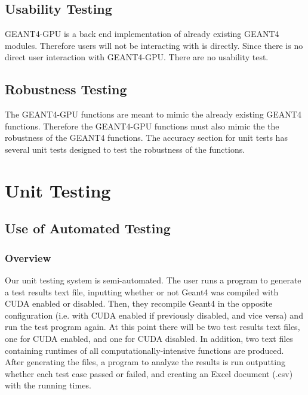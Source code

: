 \documentclass[12pt]{article}
\begin{document}
\subsection{Usability Testing}
GEANT4-GPU is a back end implementation of already existing GEANT4 modules. Therefore users will not be interacting with is directly. Since there is no direct user interaction with GEANT4-GPU. There are no usability test. 
\subsection{Robustness Testing}
The GEANT4-GPU functions are meant to mimic the already existing GEANT4 functions. Therefore the GEANT4-GPU functions must also mimic the the robustness of the GEANT4 functions. The accuracy section for unit tests has several unit tests designed to test the robustness of the functions. 

\newpage
\section{Unit Testing}
\subsection{Use of Automated Testing}
\subsubsection{Overview}
Our unit testing system is semi-automated. The user runs a program to generate a test results text file, inputting whether or not Geant4 was compiled with CUDA enabled or disabled. Then, they recompile Geant4 in the opposite configuration (i.e. with CUDA enabled if previously disabled, and vice versa) and run the test program again. At this point there will be two test results text files, one for CUDA enabled, and one for CUDA disabled. In addition, two text files containing runtimes of all computationally-intensive functions are produced. After generating the files, a program to analyze the results is run outputting whether each test case passed or failed, and creating an Excel document (.csv) with the running times.
\end{document}
